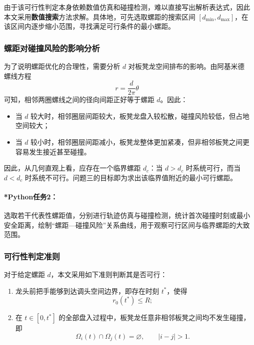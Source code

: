 \documentclass[12pt,a4paper]{ctexart}
\begin{document}
由于该可行性判定本身依赖数值仿真和碰撞检测，难以直接写出解析表达式，因此本文采用\textbf{数值搜索}方法求解。具体地，可先选取螺距的搜索区间 $[d_{\min},d_{\max}]$，在该区间内逐步缩小范围，寻找满足可行条件的最小螺距。

\subsubsection{螺距对碰撞风险的影响分析}
为了说明螺距优化的合理性，需要分析 $d$ 对板凳龙空间排布的影响。由阿基米德螺线方程
\[
r=\frac{d}{2\pi}\theta
\]
可知，相邻两圈螺线之间的径向间距正好等于螺距 $d$。因此：

\begin{itemize}
    \item 当 $d$ 较大时，相邻圈层间距较大，板凳龙盘入较松散，碰撞风险较低，但占地空间较大；
    \item 当 $d$ 较小时，相邻圈层间距减小，板凳龙整体更加紧凑，但非相邻板凳之间更容易发生接近甚至碰撞。
\end{itemize}

因此，从几何直观上看，应存在一个临界螺距 $d_c$：当 $d>d_c$ 时系统可行，而当 $d<d_c$ 时系统不可行。问题三的目标即为求出该临界值附近的最小可行螺距。

\paragraph{*Python任务2：}
选取若干代表性螺距值，分别进行轨迹仿真与碰撞检测，统计首次碰撞时刻或最小安全距离，绘制“螺距—碰撞风险”关系曲线，用于观察可行区间与临界螺距的大致范围。

\subsubsection{可行性判定准则}
对于给定螺距 $d$，本文采用如下准则判断其是否可行：

\begin{enumerate}
    \item 龙头前把手能够到达调头空间边界，即存在时刻 $t^\ast$，使得
    \begin{equation}
    r_0(t^\ast)\le R;
    \end{equation}
    \item 在 $t\in[0,t^\ast]$ 的全部盘入过程中，板凳龙任意非相邻板凳之间均不发生碰撞，即
    \begin{equation}
    \Omega_i(t)\cap\Omega_j(t)=\varnothing,\qquad |i-j|>1.
    \end{equation}
\end{enumerate}
\end{document}
